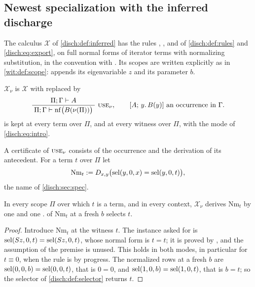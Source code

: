 \subsection{Newest specialization with the inferred discharge}
\label{wit:sec:spec-x}

The calculus $\mathcal X$ of \cref{disch:def:inferred} has the rules
, ,  and  of
\cref{disch:def:rules} and \eqref{disch:eq:export}, on full normal forms of
iterator terms with normalizing substitution, in the convention with
.  Its scopes are written explicitly as in
\cref{wit:def:scope}:  appends its eigenvariable $z$ and
 its parameter $b$.

\begin{definition}
\label{wit:def:xnu}
$\mathcal X_\nu$ is $\mathcal X$ with  replaced by
\[
 \infrule{\Pi;\Gamma\proves A}{\Pi;\Gamma\proves\nf\bigl(B(\nu(\Pi))\bigr)}
 \ \rulename{Use}_\nu,
 \qquad [A;\,y.\,B(y)]\text{ an occurrence in }\Gamma .
\]
 is kept at every term over $\Pi$, and  at
every witness over $\Pi$, with the mode of \eqref{disch:eq:intro}.
\end{definition}

A certificate of $\rulename{Use}_\nu$ consists of the occurrence and the
derivation of its antecedent.  For a term $t$ over $\Pi$ let
\[
 \mathrm{Nm}_t\mathrel{:=}D_{x,y}\bigl(\operatorname{sel}(y,0,x)=\operatorname{sel}(y,0,t)\bigr),
\]
the name of \cref{disch:sec:spec}.

\begin{lemma}
\label{wit:lem:x-name}
In every scope $\Pi$ over which $t$ is a term, and in every context,
$\mathcal X_\nu$ derives $\mathrm{Nm}_t$ by one  and one
.   of $\mathrm{Nm}_t$ at a fresh $b$
selects $t$.
\end{lemma}

\begin{proof}
Introduce $\mathrm{Nm}_t$ at the witness $t$.  The instance asked for is
$\operatorname{sel}(S z,0,t)=\operatorname{sel}(S z,0,t)$, whose normal form is $t=t$; it is
proved by , and the assumption of the premise is unused.
This holds in both modes, in particular for $t\equiv 0$, when the rule is by
progress.  The normalized rows at a fresh $b$ are $\operatorname{sel}(0,0,b)=\operatorname{sel}(0,0,t)$,
that is $0=0$, and $\operatorname{sel}(1,0,b)=\operatorname{sel}(1,0,t)$, that is $b=t$; so the selector
of \cref{disch:def:selector} returns $t$.
\end{proof}

